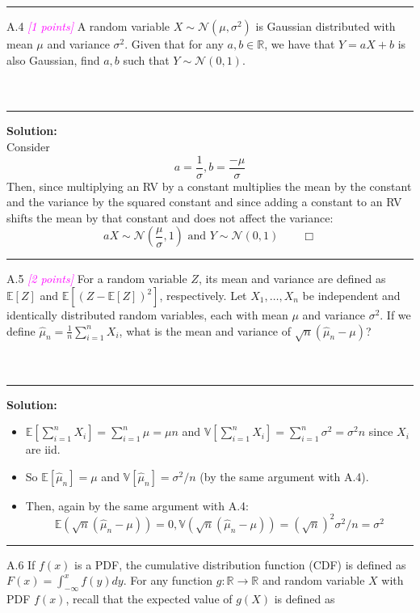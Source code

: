 \documentclass{article}
\newcommand{\field}[1]{\mathbb{#1}}
\newcommand{\1}{\mathbf{1}}
\newcommand{\E}{\mathbb{E}}
\newcommand{\V}{\mathbb{V}}
\newcommand{\R}{\field{R}} %
\newcommand{\points}[1]{\small\textcolor{magenta}{\emph{[#1 points]}} \normalsize}
\begin{document}
\noindent\rule{\textwidth}{1pt}

A.4 \points{1} A random variable $X \sim \mathcal{N}(\mu, \sigma^2)$ is Gaussian distributed with mean $\mu$ and variance $\sigma^2$. Given that for any $a,b \in \R$, we have that $Y = aX + b$ is also Gaussian, find $a,b$ such that $Y \sim \mathcal{N}(0,1)$.\\
\\
\\
    \noindent\rule{\textwidth}{1pt}
    {\bf Solution:}\\
    Consider $$\boxed{a = \frac{1}{\sigma}, b = \frac{-\mu}{\sigma}}$$ 
    Then, since multiplying an RV by a constant multiplies the mean by the constant and the variance by the squared constant and since adding a constant to an RV shifts the mean by that constant and does not affect the variance:
    $$
    aX \sim \mathcal{N}(\frac{\mu}{\sigma}, 1) \text{  and  } Y \sim \mathcal{N}(0,1) \qquad \Box
    $$
    \noindent\rule{\textwidth}{1pt}
A.5 \points{2} For a random variable $Z$, its mean and variance are defined as $\E[Z]$ and $\E[(Z-\E[Z])^2]$, respectively.
Let $X_1,\dots,X_n$ be independent and identically distributed random variables, each with mean $\mu$ and variance $\sigma^2$. 
If we define $\widehat{\mu}_n = \frac{1}{n} \sum_{i=1}^n X_i$, what is the mean and variance of $\sqrt{n}(\widehat{\mu}_n - \mu)$?\\
\\
\\
    \noindent\rule{\textwidth}{1pt}
    {\bf Solution:}\\
    \begin{itemize}
    \item $\E[\sum_{i=1}^n X_i] = \sum_{i=1}^n \mu = \mu n$ and $\V[\sum_{i=1}^n X_i] = \sum_{i=1}^n \sigma^2 = \sigma^2 n$ since $X_i$ are iid.
    
    \item So $\E[\widehat{\mu}_n] = \mu$ and $\V[\widehat{\mu}_n] = \sigma^2/n$ (by the same argument with A.4).
    \item Then, again by the same argument with A.4: $$\boxed{\E(\sqrt{n}(\widehat{\mu}_n - \mu)) = 0, \V(\sqrt{n}(\widehat{\mu}_n - \mu)) = (\sqrt{n})^2\sigma^2/n = \sigma^2}$$
    \end{itemize}
    \noindent\rule{\textwidth}{1pt}
A.6 If $f(x)$ is a PDF, the cumulative distribution function (CDF)
  is  defined as $F(x) = \int_{-\infty}^x f(y) dy$.  For any function
  $g : \R \rightarrow \R$ and random variable $X$ with PDF $f(x)$,
  recall that the expected value of $g(X)$ is defined as
\end{document}
